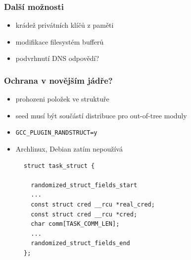 \documentclass{beamer}
\begin{document}
\begin{frame}
\frametitle{Další možnosti}
\begin{itemize}
	\item krádež privátních klíčů z paměti
	\item modifikace filesystém bufferů
	\item podvrhnutí DNS odpovědí?
\end{itemize}
\end{frame}

\begin{frame}[fragile]
\frametitle{Ochrana v novějším jádře?}
\begin{itemize}
	\item prohozeni položek ve struktuře
	\item seed musí být součástí distribuce pro out-of-tree moduly
	\item \texttt{GCC\_PLUGIN\_RANDSTRUCT=y}
	\item Archlinux, Debian zatím nepoužívá
\end{itemize}
\begin{figure}
\begin{verbatim}
struct task_struct {
  
  randomized_struct_fields_start
  ...
  const struct cred __rcu *real_cred;
  const struct cred __rcu *cred;
  char comm[TASK_COMM_LEN];
  ...
  randomized_struct_fields_end
};
\end{verbatim}
\end{figure}


\end{frame}



 
\end{document}
